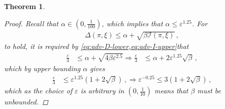 \documentclass[letter, 12pt]{report}
\newcommand{\paren}[1]{\left( #1 \right)}
\newcommand{\I}{\mathcal{I}}
\newcommand{\1}{\mathbf{1}}
\renewcommand{\epsilon}{\varepsilon}
\theoremstyle{plain}
\newtheorem{theorem}{Theorem}
\theoremstyle{definition}
\theoremstyle{remark}
\begin{document}
\begin{theorem}
\begin{proof}
        Recall that $\alpha \in (0, \frac{1}{100})$, which implies that
        $\alpha \leq \epsilon^{1.25}$. For
        \begin{align*}
            \Delta(\pi, \xi) \leq \alpha + \sqrt{\beta \I(\pi, \xi)}\,,
        \end{align*}
        to hold, it is required by \cref{eq:adv-D-lower,eq:adv-I-upper}that
        \begin{align*}
            \frac{\epsilon}{3} & \leq \alpha + \sqrt{4 \beta \epsilon^{2.5}}
            \Rightarrow
            \frac{\epsilon}{3} & \leq \alpha + 2  \epsilon^{1.25} \sqrt{\beta}\,,
        \end{align*}
        which by upper bounding $\alpha$ gives
        \begin{align*}
            \frac{\epsilon}{3} & \leq \epsilon^{1.25} \left(1 + 2\sqrt{\beta}\right)\,,
            \Rightarrow
            \epsilon^{- 0.25} \leq 3\left(1 + 2\sqrt{\beta}\right)\,,
        \end{align*}
        which as the choice of $\epsilon$ is arbitrary in $(0, \frac{1}{10})$ means that $\beta$ must be unbounded.
    \end{proof}
\end{theorem}
\end{document}
